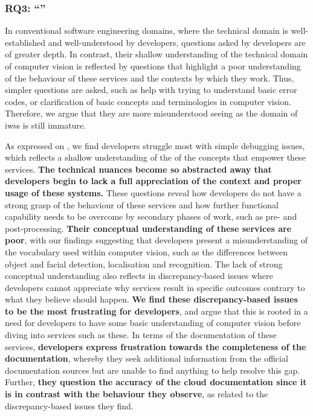 \subsubsection*{RQ3: ``\RQThreeTextDevMiscomprehension{}''}

\begin{callout}
In conventional software engineering domains, where the technical domain is well-established and well-understood by developers, questions asked by developers are of greater depth. In contrast, their shallow understanding of the technical domain of computer vision is reflected by questions that highlight a poor understanding of the behaviour of these services and the contexts by which they work. Thus, simpler questions are asked, such as help with trying to understand basic error codes, or clarification of basic concepts and terminologies in computer vision. Therefore, we argue that they are more misunderstood seeing as the domain of \glspl{iws} is still immature.
\end{callout}
As expressed on , we find developers struggle most with simple debugging issues, which reflects a shallow understanding of the of the  concepts that empower these services. \textbf{The technical nuances become so abstracted away that developers begin to lack a full appreciation of the context and proper usage of these systems.} These questions reveal how developers do not have a strong grasp of the behaviour of these services and how further functional capability needs to be overcome by secondary phases of work, such as pre- and post-processing. \textbf{Their conceptual understanding of these services are poor}, with our findings suggesting that developers present a misunderstanding of the vocabulary used within computer vision, such as the differences between object and facial detection, localisation and recognition. The lack of strong conceptual understanding also reflects in discrepancy-based issues where developers cannot appreciate why services result in specific outcomes contrary to what they believe should happen.
\textbf{We find these discrepancy-based issues to be the most frustrating for developers}, and argue that this is rooted in a need for developers to have some basic understanding of computer vision before diving into services such as these. In terms of the documentation of these services, \textbf{developers express frustration towards the completeness of the documentation}, whereby they seek additional information from the official documentation sources but are unable to find anything to help resolve this gap. Further, \textbf{they question the accuracy of the cloud documentation since it is in contrast with the behaviour they observe}, as related to the discrepancy-based issues they find. 
